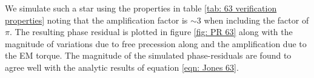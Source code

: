 We simulate such a star using the properties in table \ref{tab: 63 verification
properties} noting that the amplification factor is $\sim 3$ when including the
factor of $\pi$. The resulting phase residual is plotted in figure \ref{fig: PR
63} along with the magnitude of variations due to free precession along and the
amplification due to the EM torque. The magnitude of the simulated
phase-residuals are found to agree well with the analytic results of equation
\eqref{eqn: Jones 63}.

%    
%

\begin{figure}[htb]
\begin{floatrow}
\capbtabbox{%
  
}{%
  \caption{}%
  \label{tab: 63 verification properties}
}
\end{floatrow}
\end{figure}


